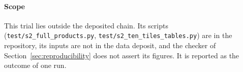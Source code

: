\paragraph{Scope}
This trial lies outside the deposited chain. Its scripts
(\texttt{test/s2\_full\_products.py}, \texttt{test/s2\_ten\_tiles\_tables.py})
are in the repository, its inputs are not in the data deposit, and the
checker of Section~\ref{sec:reproducibility} does not assert its
figures. It is reported as the outcome of one run.
